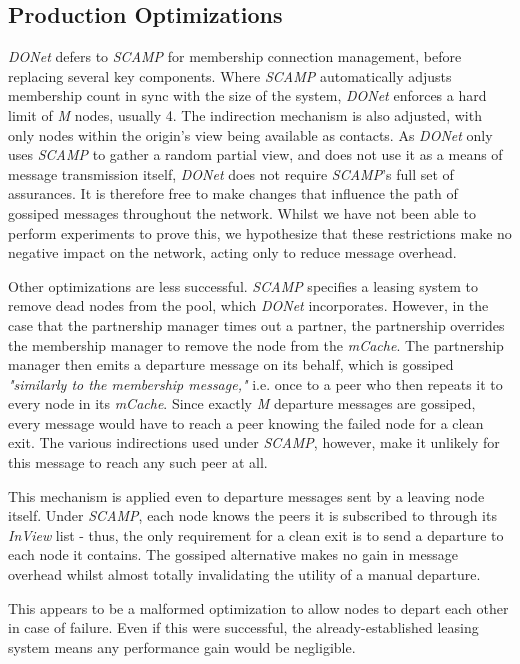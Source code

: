 \documentclass[12pt,a4paper]{article}
\begin{document}
\subsection{Production Optimizations} \label{problems:prodopt}
\textit{DONet} defers to \textit{SCAMP} for membership connection management, before replacing several key components. Where \textit{SCAMP} automatically adjusts membership count in sync with the size of the system, \textit{DONet} enforces a hard limit of \textit{M} nodes, usually 4. The indirection mechanism is also adjusted, with only nodes within the origin's view being available as contacts. As \textit{DONet} only uses \textit{SCAMP} to gather a random partial view, and does not use it as a means of message transmission itself, \textit{DONet} does not require \textit{SCAMP}'s full set of assurances. It is therefore free to make changes that influence the path of gossiped messages throughout the network. Whilst we have not been able to perform experiments to prove this, we hypothesize that these restrictions make no negative impact on the network, acting only to reduce message overhead.

Other optimizations are less successful. \textit{SCAMP} specifies a leasing system to remove dead nodes from the pool, which \textit{DONet} incorporates. However, in the case that the partnership manager times out a partner, the partnership overrides the membership manager to remove the node from the \textit{mCache}. The partnership manager then emits a departure message on its behalf, which is gossiped \textit{"similarly to the membership message,"} i.e. once to a peer who then repeats it to every node in its \textit{mCache}. Since exactly \textit{M} departure messages are gossiped, every message would have to reach a peer knowing the failed node for a clean exit. The various indirections used under \textit{SCAMP}, however, make it unlikely for this message to reach any such peer at all.

This mechanism is applied even to departure messages sent by a leaving node itself. Under  \textit{SCAMP}, each node knows the peers it is subscribed to through its \textit{InView} list - thus, the only requirement for a clean exit is to send a departure to each node it contains. The gossiped alternative makes no gain in message overhead whilst almost totally invalidating the utility of a manual departure.

This appears to be a malformed optimization to allow nodes to depart each other in case of failure. Even if this were successful, the already-established leasing system means any performance gain would be negligible.
\end{document}
